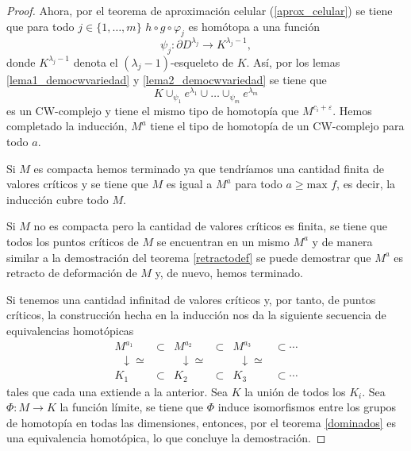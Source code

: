 \begin{proof}
    Ahora, por el teorema de aproximación celular (\ref{aprox_celular}) se tiene que para todo $j\in\{1,\dots,m\}$ $h\circ g\circ\varphi_j$ es homótopa a una función
    \begin{equation*}
        \psi_j: \partial D^{\lambda_j} \to K^{\lambda_j - 1},
    \end{equation*}
    donde $K^{\lambda_j - 1}$ denota el $(\lambda_j -1)$-esqueleto de $K$. Así, por los lemas \ref{lema1_democwvariedad} y \ref{lema2_democwvariedad} se tiene que 
    \begin{equation*}
        K\cup_{\psi_1} e^{\lambda_1} \cup\dots\cup_{\psi_m} e^{\lambda_m}
    \end{equation*}
    es un CW-complejo y tiene el mismo tipo de homotopía que $M^{c_i+\varepsilon}$. Hemos completado la inducción, $M^a$ tiene el tipo de homotopía de un CW-complejo para todo $a$.

    Si $M$ es compacta hemos terminado ya que tendríamos una cantidad finita de valores críticos y se tiene que $M$ es igual a $M^a$ para todo $a\ge \text{max }f$, es decir, la inducción cubre todo $M$.

    Si $M$ no es compacta pero la cantidad de valores críticos es finita, se tiene que todos los puntos críticos de $M$ se encuentran en un mismo $M^a$ y de manera similar a la demostración del teorema \ref{retractodef} se puede demostrar que $M^a$ es retracto de deformación de $M$ y, de nuevo, hemos terminado.

    Si tenemos una cantidad infinitad de valores críticos y, por tanto, de puntos críticos, la construcción hecha en la inducción nos da la siguiente secuencia de equivalencias homotópicas
    \[
        \begin{array}{cccccc}
            M^{a_1} & \subset & M^{a_2} & \subset & M^{a_3} & \subset \cdots \\
            \;\;\downarrow{\simeq} & & \;\;\downarrow{\simeq} & & \;\;\downarrow{\simeq} & \\
            K_1 & \subset & K_2 & \subset & K_3 & \subset \cdots
        \end{array}
    \]
    tales que cada una extiende a la anterior. Sea $K$ la unión de todos los $K_i$. Sea $\Phi:M\to K$ la función límite, se tiene que $\Phi$ induce isomorfismos entre los grupos de homotopía en todas las dimensiones, entonces, por el teorema \ref{dominados} es una equivalencia homotópica, lo que concluye la demostración.

\end{proof}
